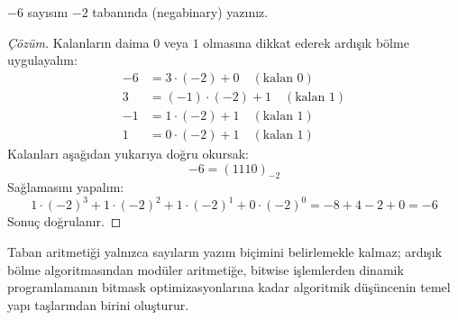 \begin{example}
$-6$ sayısını $-2$ tabanında (negabinary) yazınız.
\end{example}

\begin{proof}[Çözüm]
Kalanların daima $0$ veya $1$ olmasına dikkat ederek ardışık bölme uygulayalım:
\begin{align*}
-6 &= 3 \cdot (-2) + 0 \quad (\text{kalan } 0) \\
3 &= (-1) \cdot (-2) + 1 \quad (\text{kalan } 1) \\
-1 &= 1 \cdot (-2) + 1 \quad (\text{kalan } 1) \\
1 &= 0 \cdot (-2) + 1 \quad (\text{kalan } 1)
\end{align*}
Kalanları aşağıdan yukarıya doğru okursak:
\[
-6 = (1110)_{-2}
\]
Sağlamasını yapalım:
\[
1 \cdot (-2)^3 + 1 \cdot (-2)^2 + 1 \cdot (-2)^1 + 0 \cdot (-2)^0 = -8 + 4 - 2 + 0 = -6
\]
Sonuç doğrulanır.
\end{proof}

Taban aritmetiği yalnızca sayıların yazım biçimini belirlemekle kalmaz; ardışık bölme algoritmasından modüler aritmetiğe, bitwise işlemlerden dinamik programlamanın bitmask optimizasyonlarına kadar algoritmik düşüncenin temel yapı taşlarından birini oluşturur.
